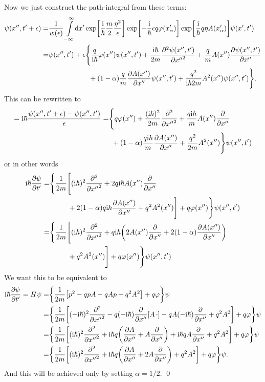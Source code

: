 \documentclass[11pt,letter, swedish, english
]{article}
\begin{document}
Now we just construct the path-integral from these terms:
\begin{equation}
\begin{aligned}
\psi(x'', t'+\epsilon)
=&\frac{1}{w(\epsilon)}\int_{-\infty}^{\infty}\!\rd{x'}
\exp[\frac{\ii}{\hbar}\frac{m}{2}\frac{\eta^2}{\epsilon}]
\exp[-\frac{\ii}{\hbar}\epsilon q\varphi(x'_\alpha)]
\exp[\frac{\ii}{\hbar} q\eta A(x'_\alpha)]
\psi(x', t')\\
=& \psi(x'', t') + \epsilon \Bigg\{
\frac{q}{\ii\hbar}\varphi(x'')\psi(x'', t')
+\frac{\ii\hbar}{2m}\pdv[2]{\psi(x'', t')}{{x''}}
+\frac{q}{m}A(x'')\pdv{\psi(x'', t')}{x''}\\
&\phantom{\psi(x'', t') + \epsilon\{ }
+(1-\alpha)\frac{q}{m}\pdv{A(x'')}{x''}\psi(x'', t')
+\frac{q^2}{\ii\hbar2m}A^2(x'')\psi(x'', t')
\Bigg\}.
\end{aligned}
\end{equation}
This can be rewritten to%
\begin{equation}
\begin{aligned}
=\mathrm{i}\hbar\frac{\psi(x'', t'+\epsilon)-\psi(x'', t')}{\epsilon}
=&  \Bigg\{
q\varphi(x'')
+\frac{(\mathrm{i}\hbar)^2}{2m}\pdv[2]{{x''}}
+\frac{q\mathrm{i}\hbar}{m}A(x'')\pdv{x''}\\
&\phantom{(}
+(1-\alpha)\frac{q\mathrm{i}\hbar}{m}\pdv{A(x'')}{x''}
+\frac{q^2}{2m}A^2(x'')
\Bigg\}\psi(x'', t')
\end{aligned}
\end{equation}
or in other words
\begin{equation}
\begin{aligned}
\mathrm{i}\hbar\pdv{\psi}{{t'}}
=&  \Bigg\{\frac{1}{2m}\Bigg[
(\mathrm{i}\hbar)^2\pdv[2]{{x''}}
+2q\mathrm{i}\hbar A(x'')\pdv{x''}\\
&\phantom{(2m))}
+2(1-\alpha)q\mathrm{i}\hbar\pdv{A(x'')}{x''}
+q^2A^2(x'')\Bigg]
+q\varphi(x'')\Bigg\}\psi(x'', t')\\
=&  \Bigg\{\frac{1}{2m}\Bigg[
(\mathrm{i}\hbar)^2\pdv[2]{{x''}}
+q\mathrm{i}\hbar\qty( 2A(x'')\pdv{x''}
+2(1-\alpha)\pdv{A(x'')}{x''})\\
&\phantom{(2m)(}
+q^2A^2(x'')\Bigg]
+q\varphi(x'')\Bigg\}\psi(x'', t')\\
\end{aligned}
\end{equation}
We want this to be equivalent to 
\begin{equation}
\begin{aligned}
\mathrm{i}\hbar\pdv{\psi}{{t'}}
=H\psi
=&\qty{\frac{1}{2m}\qty[p^2 - qpA-qAp+q^2A^2] + q\varphi}\psi\\
=&\qty{\frac{1}{2m}\qty[(-\mathrm{i}\hbar)^2\pdv[2]{{x''}} 
- q(-\mathrm{i}\hbar) \pdv{x''}[A\,\cdot]
-qA(-\mathrm{i}\hbar)\pdv{x''}+q^2A^2] + q\varphi}\psi\\
=&\qty{\frac{1}{2m}\qty[(\mathrm{i}\hbar)^2\pdv[2]{{x''}} 
+ \mathrm{i}\hbar q\qty(\pdv{A}{x''}+A\pdv{x''})
+\mathrm{i}\hbar qA\pdv{x''}+q^2A^2] + q\varphi}\psi\\
=&\qty{\frac{1}{2m}\qty[(\mathrm{i}\hbar)^2\pdv[2]{{x''}} 
+ \mathrm{i}\hbar q\qty(\pdv{A}{x''}+2A\pdv{x''})
+q^2A^2] + q\varphi}\psi.
\end{aligned}
\end{equation}
And this will be achieved only by setting $\alpha=1/2$.
\qed
\end{document}
